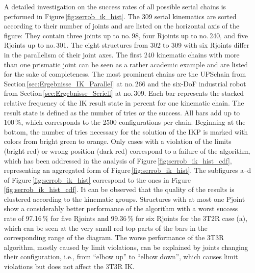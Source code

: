 \documentclass[robotics,article,accept,moreauthors,pdftex]{Definitions/mdpi}
\begin{document}
A detailed investigation on the success rates of all possible serial chains is performed in Figure\,\ref{fig:serrob_ik_hist}.
The 309 serial kinematics are sorted according to their number of  joints and are listed on the horizontal axis of the figure: They contain three  joints up to no.\,98, four R\replaced[id=Sp]{ }{-}joints up to no.\,240, and five R\replaced[id=Sp]{ }{-}joints up to no.\,301.
The eight structures from 302 to 309 with six R\replaced[id=Sp]{ }{-}joints differ in the parallelism of their joint axes.
The first 240 kinematic chains with more than one prismatic joint can be seen as a rather academic example and are listed for the sake of completeness.
The most prominent chains are the UPS\replaced[id=Sp]{ }{-}chain from Section\,\ref{sec:Ergebnisse_IK_Parallel} at no.\,266 and the six-DoF industrial robot from Section\,\ref{sec:Ergebnisse_Seriell} at no.\,309.
Each bar represents the stacked relative frequency of the IK result state in percent for one kinematic chain.
The result state is defined as the number of tries or the success.
All bars add up to 100\,\%, which corresponds to the 2500 configurations per chain.
Beginning at the bottom, the number of tries necessary for the solution of the IKP is marked with colors from bright green to orange.
Only cases with a violation of the limits (bright red) or wrong position (dark red) correspond to a failure of the algorithm, which has been addressed in the analysis of Figure\,\ref{fig:serrob_ik_hist_cdf}, representing an aggregated form of Figure\,\ref{fig:serrob_ik_hist}.
The subfigures a--d of Figure\,\ref{fig:serrob_ik_hist} correspond to the ones in Figure\,\ref{fig:serrob_ik_hist_cdf}.
It can be observed that the quality of the results is clustered according to the kinematic groups.
Structures with at most one P\replaced[id=Sp]{ }{-}joint show a considerably better performance of the algorithm with a worst success rate of 97.16\,\% for five R\replaced[id=Sp]{ }{-}joints %
and 99.36\,\% for six R\replaced[id=Sp]{ }{-}joints %
for the 3T2R case (a), which can be seen at the very small red top parts of the bars in the corresponding range of the diagram.
The worse performance of the 3T3R algorithm, mostly caused by limit violations, can be explained by joints changing their configuration, i.e., from ``elbow up'' to ``elbow down'', which causes limit violations but does not affect the 3T3R IK.
\end{document}
